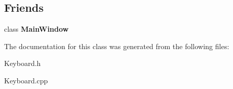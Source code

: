 \subsection*{Friends}
\begin{DoxyCompactItemize}
\item 
\mbox{\label{class_keyboard_af9db4b672c4d3104f5541893e08e1809}} 
class {\bfseries Main\+Window}
\end{DoxyCompactItemize}


The documentation for this class was generated from the following files\+:\begin{DoxyCompactItemize}
\item 
Keyboard.\+h\item 
Keyboard.\+cpp\end{DoxyCompactItemize}
